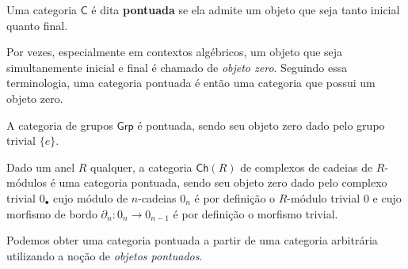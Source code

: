 \begin{defin}\label{defin:categoria_pontuada}
  Uma categoria $\mathsf{C}$ é dita \textbf{pontuada} se ela admite um objeto que seja tanto inicial quanto final.
\end{defin}

\begin{obs}
  Por vezes, especialmente em contextos algébricos, um objeto que seja simultanemente inicial e final é chamado de \emph{objeto zero}.
  Seguindo essa terminologia, uma categoria pontuada é então uma categoria que possui um objeto zero.
\end{obs}

\begin{exem}\label{exem:categorias_pontuadas_algebricas}
  A categoria de grupos $\mathsf{Grp}$ é pontuada, sendo seu objeto zero dado pelo grupo trivial $\{e\}$.

  Dado um anel $R$ qualquer, a categoria $\mathsf{Ch}(R)$ de complexos de cadeias de $R$-módulos é uma categoria pontuada, sendo seu objeto zero dado pelo complexo trivial $0_{\bullet}$ cujo módulo de $n$-cadeias $0_{n}$ é por definição o $R$-módulo trivial $0$ e cujo morfismo de bordo $\partial_{n}: 0_{n} \to 0_{n-1}$ é por definição o morfismo trivial.
\end{exem}

Podemos obter uma categoria pontuada a partir de uma categoria arbitrária utilizando a noção de \emph{objetos pontuados}.

